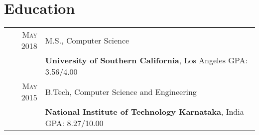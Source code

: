 \section{Education}
\begin{tabular}{rl}

\textsc{May 2018} & M.S., Computer Science\\
&\textbf{University of Southern California}, Los Angeles\hspace{5.0cm} 
GPA: 3.56/4.00
\vspace{0.2cm}
\\    
\textsc{May 2015} & B.Tech, Computer Science and Engineering \\
&\textbf{National Institute of Technology Karnataka}, India\hspace{4.0cm} GPA: 8.27/10.00
\end{tabular}
\vspace{5pt}